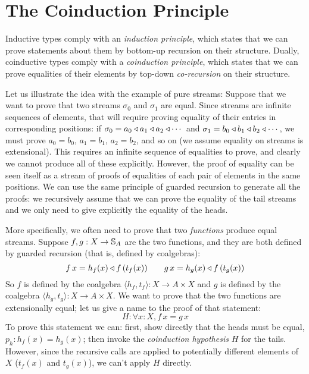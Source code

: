 \section{The Coinduction Principle}

Inductive types comply with an {\em induction principle}, which states that we can prove statements about them by bottom-up recursion on their structure.
Dually, coinductive types comply with a {\em coinduction principle}, which states that we can prove equalities of their elements by top-down {\em co-recursion} on their structure.

Let us illustrate the idea with the example of pure streams:
Suppose that we want to prove that two streams $\sigma_0$ and $\sigma_1$ are equal.
Since streams are infinite sequences of elements, that will require proving equality of their entries in corresponding positions: if $\sigma_0 = a_0\triangleleft a_1\triangleleft a_2\triangleleft \cdots$ and  $\sigma_1 = b_0\triangleleft b_1\triangleleft b_2\triangleleft \cdots$, we must prove $a_0 = b_0$, $a_1 = b_1$, $a_2=b_2$, and so on (we assume equality on streams is extensional).
This requires an infinite sequence of equalities to prove, and clearly we cannot produce all of these explicitly.
However, the proof of equality can be seen itself as a stream of proofs of equalities of each pair of elements in the same positions.
We can use the same principle of guarded recursion to generate all the proofs: we recursively assume that we can prove the equality of the tail streams and we only need to give explicitly the equality of the heads.

More specifically, we often need to prove that two \emph{functions} produce equal streams.
Suppose $f,g:X \rightarrow \mathbb{S}_{A}$ are the two functions, and they are both defined by guarded recursion (that is, defined by coalgebras):
$$
f\,x = h_f(x) \triangleleft f\,(t_f(x)) \qquad g\,x = h_g(x) \triangleleft f\,(t_g(x))
$$
So $f$ is defined by the coalgebra $\langle h_f, t_f\rangle : X \rightarrow A\times X$ and $g$ is defined by the coalgebra $\langle h_g, t_g\rangle : X \rightarrow A\times X$.
We want to prove that the two functions are extensionally equal; let us give a name to the proof of that statement:
$$
H: \forall x:X, f\,x = g\,x
$$
To prove this statement we can: first, show directly that the heads must be equal, $p_h:h_f(x) = h_g(x)$; then invoke the {\em coinduction hypothesis} $H$ for the tails.
However, since the recursive calls are applied to potentially different elements of $X$ ($t_f(x)$ and $t_g(x)$), we can't apply $H$ directly.

